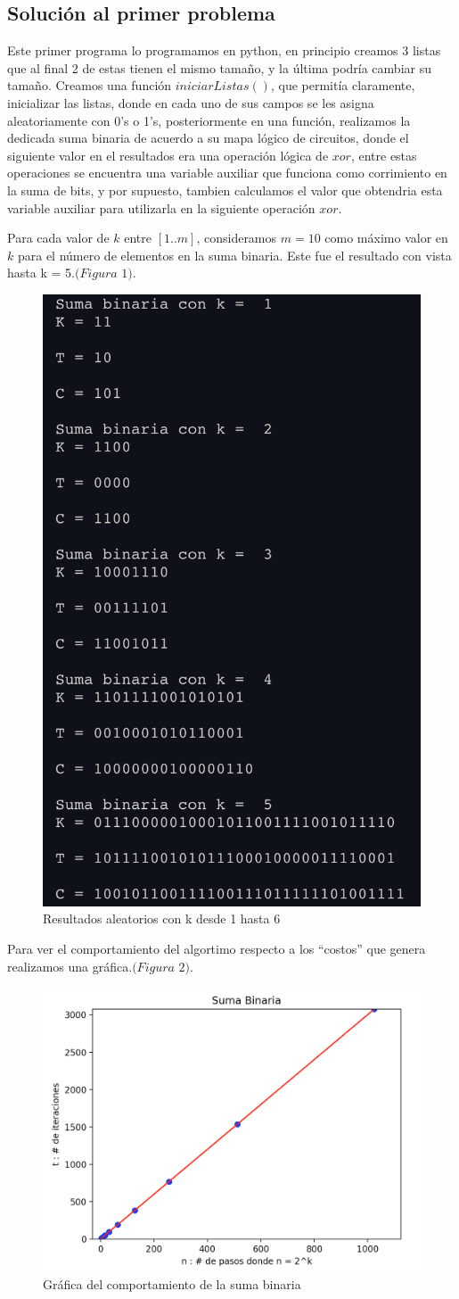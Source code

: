 \documentclass[12pt,twoside]{article}
\begin{document}
\subsection{\textbf{Soluci\'on al primer problema}}
Este primer programa lo programamos en python, en principio creamos 3 listas que al final 2 de estas tienen el mismo tamaño, y la 
\'ultima podr\'ia cambiar su tama\~no. Creamos una funci\'on $iniciarListas()$, que permit\'ia claramente, inicializar las listas,
donde en cada uno de sus campos se les asigna aleatoriamente con 0's o 1's, posteriormente en una funci\'on, realizamos la dedicada
suma binaria de acuerdo a su mapa l\'ogico de circuitos, donde el siguiente valor en el resultados era una operaci\'on l\'ogica de 
$xor$, entre estas operaciones se encuentra una variable auxiliar que funciona como corrimiento en la suma de bits, y por supuesto,
tambien calculamos el valor que obtendria esta variable auxiliar para utilizarla en la siguiente operaci\'on $xor$.
\centerline{}
Para cada valor de $k$ entre $[1..m]$, consideramos $m = 10$ como m\'aximo valor en $k$ para el n\'umero 
de elementos en la suma binaria. Este fue el resultado con vista hasta k = 5.$(Figura$ $1)$.
\begin{figure}
  \centering
    \includegraphics[height=0.5\textwidth]{Figure1}
  \caption{Resultados aleatorios con k desde 1 hasta 6}
  \label{fig:ejemplo1}
\end{figure}

Para ver el comportamiento del algortimo respecto a los ``costos'' que genera realizamos una gr\'afica.$(Figura$ $2)$.

\begin{figure}
  \centering
    \includegraphics[height=0.5\textwidth]{Figure2}
  \caption{Gr\'afica del comportamiento de la suma binaria}
  \label{fig:ejemplo2}
\end{figure}
\end{document}
